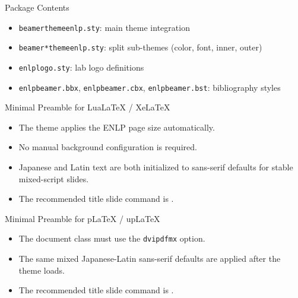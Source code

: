 \documentclass[10pt]{beamer}
\begin{document}
\begin{frame}{Package Contents}
  \begin{itemize}
    \item \texttt{beamerthemeenlp.sty}: main theme integration
    \item \texttt{beamer*themeenlp.sty}: split sub-themes (color, font, inner, outer)
    \item \texttt{enlplogo.sty}: lab logo definitions
    \item \texttt{enlpbeamer.bbx}, \texttt{enlpbeamer.cbx}, \texttt{enlpbeamer.bst}: bibliography styles
  \end{itemize}
\end{frame}


\begin{frame}{Minimal Preamble for LuaLaTeX / XeLaTeX}
  \begin{itemize}
    \item The theme applies the ENLP page size automatically.
    \item No manual background configuration is required.
    \item Japanese and Latin text are both initialized to sans-serif defaults for stable mixed-script slides.
    \item The recommended title slide command is \texttt{\string\enlptitleframe}.
  \end{itemize}
\end{frame}

\begin{frame}{Minimal Preamble for pLaTeX / upLaTeX}
  \begin{itemize}
    \item The document class must use the \texttt{dvipdfmx} option.
    \item The same mixed Japanese-Latin sans-serif defaults are applied after the theme loads.
    \item The recommended title slide command is \texttt{\string\enlptitleframe}.
  \end{itemize}
\end{frame}
\end{document}
